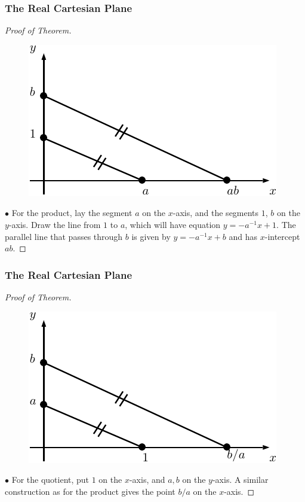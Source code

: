 \documentclass[compress,mathserif,serif]{beamer}
\begin{document}
\begin{frame}
\frametitle{The Real Cartesian Plane}
\begin{proof}[Proof of Theorem]\let\qed\relax
\begin{figure}[hbtp]
\centering
\includegraphics[scale=1]{mult.pdf}
\end{figure}
$\bullet$ For the product, lay the segment $a$ on the $x$-axis, and the segments $1$, $b$ on the $y$-axis. Draw the line from $1$ to $a$, which will have equation $y=-a^{-1}x+1$. The parallel line that passes through $b$ is given by $y=-a^{-1}x+b$ and has $x$-intercept $ab$.
\end{proof}
\end{frame}



\begin{frame}
\frametitle{The Real Cartesian Plane}
\begin{proof}[Proof of Theorem]\let\qed\relax
\begin{figure}[hbtp]
\centering
\includegraphics[scale=1]{div.pdf}
\end{figure}
$\bullet$ For the quotient, put $1$ on the $x$-axis, and $a,b$ on the $y$-axis. A similar construction as for the product gives the point $b/a$ on the $x$-axis.
\end{proof}
\end{frame}
\end{document}

